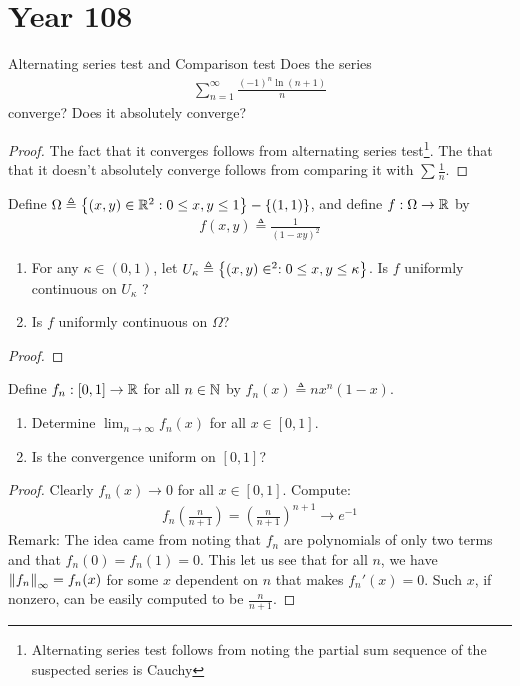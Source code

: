 \documentclass{report}
\begin{document}
\section{Year 108}
\begin{question}{Alternating series test and Comparison test}{}
Does the series
\begin{align*}
\sum_{n=1}^{\infty} \frac{(-1)^n \ln (n+1)}{n}
\end{align*}
converge? Does it absolutely converge? 
\end{question}
\begin{proof}
The fact that it converges follows from alternating series test\footnote{Alternating series test follows from noting the partial sum sequence of the suspected series is Cauchy}. The that that it doesn't absolutely converge follows from comparing it with $\sum \frac{1}{n}$.   
\end{proof}
\begin{question}{}{}
Define $\Omega \triangleq  \left\{ (x,y)\in\mathbb{R}^2 :0\leq x,y\leq 1 \right\}- \left\{ (1,1) \right\}$, and define $f:\Omega \rightarrow \mathbb{R}$ by 
\begin{align*}
f(x,y)\triangleq \frac{1}{(1-xy)^2}
\end{align*}
\begin{enumerate}[label=(\roman*)]
  \item For any $\kappa \in (0,1)$, let $U_\kappa\triangleq \left\{ (x,y)\in^2: 0\leq x,y\leq \kappa \right\}$. Is $f$ uniformly continuous on  $U_\kappa$ ?   
  \item Is $f$ uniformly continuous on $\Omega$? 
\end{enumerate}
\end{question}
\begin{proof}

\end{proof}
\begin{question}{}{}
Define $f_n:[0,1]\rightarrow \mathbb{R}$ for all $n\in\mathbb{N}$ by $f_n(x)\triangleq nx^n(1-x)$. 
\begin{enumerate}[label=(\roman*)]
  \item Determine $\lim_{n\rightarrow  \infty} f_n(x)$ for all $x\in [0,1]$. 
  \item Is the convergence uniform on $[0,1]$? 
\end{enumerate}
\end{question}
\begin{proof}
Clearly $f_n(x) \rightarrow 0$ for all $x\in [0,1]$. Compute: 
\begin{align*}
f_n \left( \frac{n}{n+1} \right) = \left(\frac{n}{n+1}   \right)^{n+1} \rightarrow  e^{-1}
\end{align*}
Remark: The idea came from noting that $f_n$ are polynomials of only two terms and that $f_n(0)=f_n(1)=0$. This let us see that for all $n$,  we have $\left\| f_n \right\|_{\infty}=f_n(x)$ for some $x$  dependent on $n$ that makes  $f_n'(x)=0$. Such $x$, if nonzero, can be easily computed to be  $\frac{n}{n+1}$.  
\end{proof}
\end{document}
